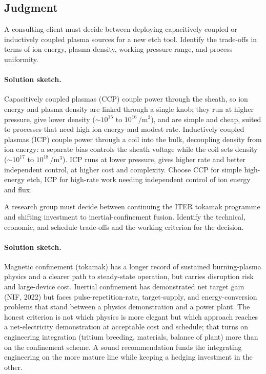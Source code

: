 \subsection*{Judgment}

\begin{exercise}
A consulting client must decide between deploying capacitively
coupled or inductively coupled plasma sources for a new etch tool.
Identify the trade-offs in terms of ion energy, plasma density,
working pressure range, and process uniformity.
\paragraph{Solution sketch.} Capacitively coupled plasmas (CCP) couple
power through the sheath, so ion energy and plasma density are linked
through a single knob; they run at higher pressure, give lower density
($\sim 10^{15}$ to $10^{16}\,\si{\per\cubic\meter}$), and are simple and
cheap, suited to processes that need high ion energy and modest rate.
Inductively coupled plasmas (ICP) couple power through a coil into the
bulk, decoupling density from ion energy: a separate bias controls the
sheath voltage while the coil sets density ($\sim 10^{17}$ to
$10^{18}\,\si{\per\cubic\meter}$). ICP runs at lower pressure, gives
higher rate and better independent control, at higher cost and complexity.
Choose CCP for simple high-energy etch, ICP for high-rate work needing
independent control of ion energy and flux.
\end{exercise}

\begin{exercise}
A research group must decide between continuing the ITER tokamak
programme and shifting investment to inertial-confinement fusion.
Identify the technical, economic, and schedule trade-offs and the
working criterion for the decision.
\paragraph{Solution sketch.} Magnetic confinement (tokamak) has a longer
record of sustained burning-plasma physics and a clearer path to
steady-state operation, but carries disruption risk and large-device cost.
Inertial confinement has demonstrated net target gain (NIF, 2022) but
faces pulse-repetition-rate, target-supply, and energy-conversion problems
that stand between a physics demonstration and a power plant. The honest
criterion is not which physics is more elegant but which approach reaches
a net-electricity demonstration at acceptable cost and schedule; that
turns on engineering integration (tritium breeding, materials, balance of
plant) more than on the confinement scheme. A sound recommendation funds
the integrating engineering on the more mature line while keeping a
hedging investment in the other.
\end{exercise}

